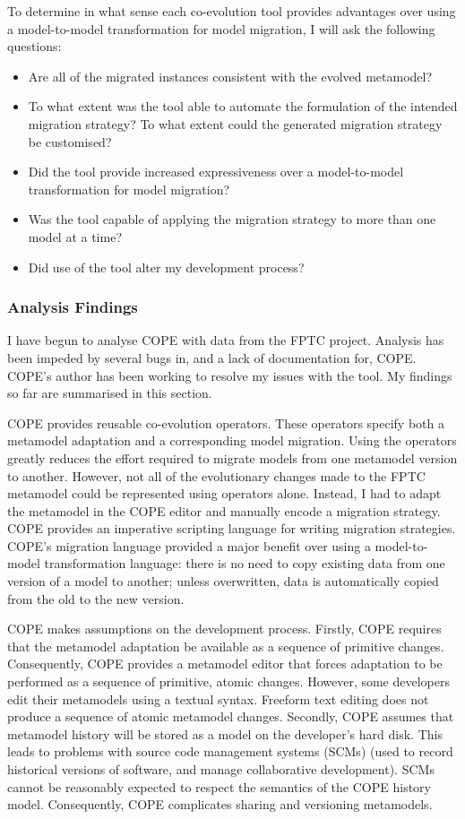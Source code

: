 To determine in what sense each co-evolution tool provides advantages over using a model-to-model transformation for model migration, I will ask the following questions:

\begin{itemize}
	\item Are all of the migrated instances consistent with the evolved metamodel?
	\item To what extent was the tool able to automate the formulation of the intended migration strategy? To what extent could the generated migration strategy be customised?
	\item Did the tool provide increased expressiveness over a model-to-model transformation for model migration?  
	\item Was the tool capable of applying the migration strategy to more than one model at a time?
	\item Did use of the tool alter my development process? 
\end{itemize}


\subsubsection{Analysis Findings}
I have begun to analyse COPE \cite{herrmannsdoerfer08cope} with data from the FPTC project.  Analysis has been impeded by several bugs in, and a lack of documentation for, COPE. COPE's author has been working to resolve my issues with the tool. My findings so far are summarised in this section.

COPE provides reusable co-evolution operators. These operators specify both a metamodel adaptation and a corresponding model migration. Using the operators greatly reduces the effort required to migrate models from one metamodel version to another. However, not all of the evolutionary changes made to the FPTC metamodel could be represented using operators alone. Instead, I had to adapt the metamodel in the COPE editor and manually encode a migration strategy. COPE provides an imperative scripting language for writing migration strategies. COPE's migration language provided a major benefit over using a model-to-model transformation language: there is no need to copy existing data from one version of a model to another; unless overwritten, data is automatically copied from the old to the new version.

COPE makes assumptions on the development process. Firstly, COPE requires that the metamodel adaptation be available as a sequence of primitive changes. Consequently, COPE provides a metamodel editor that forces adaptation to be performed as a sequence of primitive, atomic changes. However, some developers edit their metamodels using a textual syntax. Freeform text editing does not produce a sequence of atomic metamodel changes. Secondly, COPE assumes that metamodel history will be stored as a model on the developer's hard disk. This leads to problems with source code management systems (SCMs) (used to record historical versions of software, and manage collaborative development). SCMs cannot be reasonably expected to respect the semantics of the COPE history model. Consequently, COPE complicates sharing and versioning metamodels.

